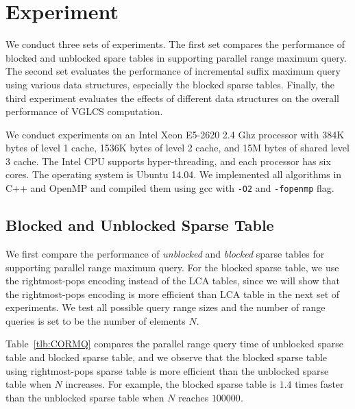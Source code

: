 \section{Experiment} \label{sec:Experiment}

We conduct three sets of experiments.  The first set compares the
performance of blocked and unblocked spare tables in supporting parallel
range maximum query.  The second set evaluates the performance of
incremental suffix maximum query using various data structures,
especially the blocked sparse tables.  Finally, the third experiment
evaluates the effects of different data structures on the overall
performance of VGLCS computation.

We conduct experiments on an Intel Xeon E5-2620 2.4 Ghz processor with
384K bytes of level 1 cache, 1536K bytes of level 2 cache, and 15M
bytes of shared level 3 cache.  The Intel CPU supports
hyper-threading, and each processor has six cores.  The operating
system is Ubuntu 14.04.  We implemented all algorithms in C++ and
OpenMP and compiled them using gcc with {\tt -O2} and {\tt -fopenmp}
flag.

\subsection{Blocked and Unblocked Sparse Table}

We first compare the performance of {\em unblocked} and {\em blocked}
sparse tables for supporting parallel range maximum query.  For the
blocked sparse table, we use the rightmost-pops encoding instead of the
LCA tables, since we will show that the rightmost-pops encoding is more
efficient than LCA table in the next set of experiments.  We test all
possible query range sizes and the number of range queries is set to be
the number of elements $N$.

Table~\ref{tlb:CORMQ} compares the parallel range query time of
unblocked sparse table and blocked sparse table, and we observe that
the blocked sparse table using rightmost-pops sparse table is more
efficient than the unblocked sparse table when $N$ increases.  For
example, the blocked sparse table is $1.4$ times faster than the
unblocked sparse table when $N$ reaches $100000$. 

